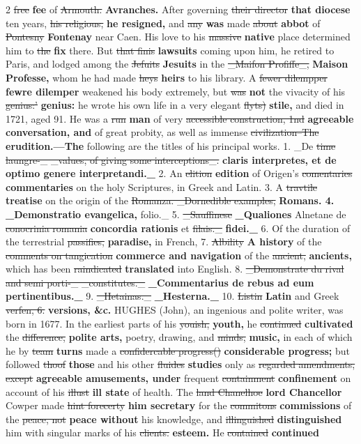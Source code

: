 \documentclass[10pt]{article}
\begin{document}
\begin{multicols}{2}
\sout{free} \textbf{fee} of \sout{Armouth.} \textbf{Avranches.} After governing \sout{their director} \textbf{that diocese} ten years, \sout{his religious,} \textbf{he resigned,} and \sout{any} \textbf{was} made \sout{about} \textbf{abbot} of \sout{Pontesny} \textbf{Fontenay} near Caen. His love to his \sout{massive} \textbf{native} place determined him to \sout{the} \textbf{fix} there. But \sout{that finis} \textbf{lawsuits} coming upon him, he retired to Paris, and lodged among the \sout{Jefuits} \textbf{Jesuits} in the \sout{\_Maifon Profiffe\_,} \textbf{Maison Professe,} whom he had made \sout{heys} \textbf{heirs} to his library. A \sout{fewer dilempper} \textbf{fewre dilemper} weakened his body extremely, but \sout{was} \textbf{not} the vivacity of his \sout{genius:'} \textbf{genius:} he wrote his own life in a very elegant \sout{flyts)} \textbf{stile,} and died in 1721, aged 91. He was a \sout{run} \textbf{man} of very \sout{accessible construction, 1nd} \textbf{agreeable conversation, and} of great probity, as well as immense \sout{civilization--The} \textbf{erudition.—The} following are the titles of his principal works. 1. \_De \sout{time laungre-\_ \_values, of giving some interceptions\_.} \textbf{claris interpretes, et de optimo genere interpretandi.\_} 2. An \sout{elition} \textbf{edition} of Origen's \sout{comentaries} \textbf{commentaries} on the holy Scriptures, in Greek and Latin. 3. A \sout{travtile} \textbf{treatise} on the origin of the \sout{Romanza. \_Dornedible examples,} \textbf{Romans. 4. \_Demonstratio evangelica,} folio.\_ 5. \sout{\_Sauffinese} \textbf{\_Qualiones} Alnetane de \sout{conocrinia romania} \textbf{concordia rationis} et \sout{filais.\_} \textbf{fidei.\_} 6. Of the duration of the terrestrial \sout{passifies,} \textbf{paradise,} in French, 7. \sout{Albility} \textbf{A history} of the \sout{comments on tangication} \textbf{commerce and navigation} of the \sout{ancient,} \textbf{ancients,} which has been \sout{raindicated} \textbf{translated} into English. 8. \sout{\_Demonstrate du rival and semi porti-\_ \_constitutes.\_} \textbf{\_Commentarius de rebus ad eum pertinentibus.\_} 9. \sout{\_Hetainas.\_} \textbf{\_Hesterna.\_} 10. \sout{Listin} \textbf{Latin} and Greek \sout{verfen, 6.} \textbf{versions, \&c.} HUGHES (John), an ingenious and polite writer, was born in 1677. In the earliest parts of his \sout{youish,} \textbf{youth,} he \sout{continued} \textbf{cultivated} the \sout{difference,} \textbf{polite arts,} poetry, drawing, and \sout{minds,} \textbf{music,} in each of which he by \sout{team} \textbf{turns} made a \sout{confidercable progress()} \textbf{considerable progress;} but followed \sout{thoof} \textbf{those} and his other \sout{fluides} \textbf{studies} only as \sout{regarded amendments, except} \textbf{agreeable amusements, under} frequent \sout{containment} \textbf{confinement} on account of his \sout{illust} \textbf{ill state} of health. The \sout{land Chanelhoe} \textbf{lord Chancellor} Cowper made \sout{hint forecerty} \textbf{him secretary} for the \sout{commitons} \textbf{commissions} of the \sout{peace, not} \textbf{peace without} his knowledge, and \sout{illinguished} \textbf{distinguished} him with singular marks of his \sout{clients.} \textbf{esteem.} He \sout{contained} \textbf{continued} 
\end{multicols}
\end{document}
